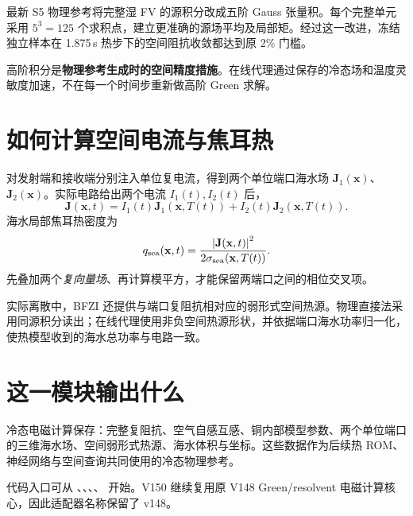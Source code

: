 最新 S5 物理参考将完整湿 FV 的源积分改成五阶 Gauss 张量积。每个完整单元采用 $5^3=125$ 个求积点，建立更准确的源场平均及局部矩。经过这一改进，冻结独立样本在 1.875\,s 热步下的空间阻抗收敛都达到原 2\% 门槛。

高阶积分是\textbf{物理参考生成时的空间精度措施}。在线代理通过保存的冷态场和温度灵敏度加速，不在每一个时间步重新做高阶 Green 求解。

\section{如何计算空间电流与焦耳热}
对发射端和接收端分别注入单位复电流，得到两个单位端口海水场 $\mathbf J_1(\mathbf x)$、$\mathbf J_2(\mathbf x)$。实际电路给出两个电流 $I_1(t),I_2(t)$ 后，
\[
\mathbf J(\mathbf x,t)
=I_1(t)\mathbf J_1(\mathbf x,T(t))
+I_2(t)\mathbf J_2(\mathbf x,T(t)).
\]
海水局部焦耳热密度为
\[
q_{\rm sea}(\mathbf x,t)=
\frac{\left|\mathbf J(\mathbf x,t)\right|^2}
{2\sigma_{\rm sea}(\mathbf x,T(t))}.
\]
先叠加两个\emph{复向量场}、再计算模平方，才能保留两端口之间的相位交叉项。

实际离散中，BFZI 还提供与端口复阻抗相对应的弱形式空间热源。物理直接法采用同源积分读出；在线代理使用非负空间热源形状，并依据端口海水功率归一化，使热模型收到的海水总功率与电路一致。

\section{这一模块输出什么}
冷态电磁计算保存：完整复阻抗、空气自感互感、铜内部模型参数、两个单位端口的三维海水场、空间弱形式热源、海水体积与坐标。这些数据作为后续热 ROM、神经网络与空间查询共同使用的冷态物理参考。

代码入口可从 、、、、 开始。V150 继续复用原 V148 Green/resolvent 电磁计算核心，因此适配器名称保留了 v148。
